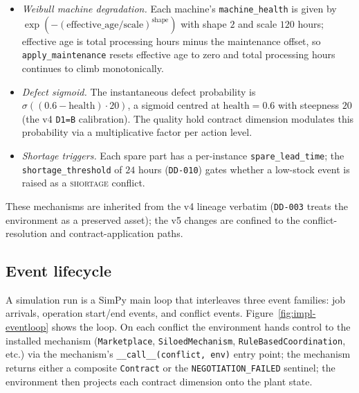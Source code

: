 \begin{itemize}[leftmargin=1.4em,itemsep=0.15em]
  \item \emph{Weibull machine degradation.} Each machine's
    \texttt{machine\_health} is given by
    $\exp(-(\text{effective\_age}/\text{scale})^{\text{shape}})$ with
    shape $2$ and scale $120$ hours; effective age is total processing
    hours minus the maintenance offset, so \texttt{apply\_maintenance}
    resets effective age to zero and total processing hours continues
    to climb monotonically.
  \item \emph{Defect sigmoid.} The instantaneous defect probability is
    $\sigma((0.6 - \text{health}) \cdot 20)$, a sigmoid centred at
    $\text{health} = 0.6$ with steepness $20$ (the v4 \texttt{D1=B}
    calibration). The quality hold contract dimension modulates this
    probability via a multiplicative factor per action level.
  \item \emph{Shortage triggers.} Each spare part has a per-instance
    \texttt{spare\_lead\_time}; the \texttt{shortage\_threshold} of
    $24$ hours (\texttt{DD-010}) gates whether a low-stock event is
    raised as a \textsc{shortage} conflict.
\end{itemize}

These mechanisms are inherited from the v4 lineage verbatim
(\texttt{DD-003} treats the environment as a preserved asset); the v5
changes are confined to the conflict-resolution and contract-application
paths.

\subsection{Event lifecycle}

A simulation run is a SimPy main loop that interleaves three event
families: job arrivals, operation start/end events, and conflict
events. Figure~\ref{fig:impl-eventloop} shows the loop. On each
conflict the environment hands control to the installed mechanism
(\texttt{Marketplace}, \texttt{SiloedMechanism},
\texttt{RuleBasedCoordination}, etc.) via the mechanism's
\texttt{\_\_call\_\_(conflict, env)} entry point; the mechanism returns
either a composite \texttt{Contract} or the \texttt{NEGOTIATION\_FAILED}
sentinel; the environment then projects each contract dimension onto
the plant state.


